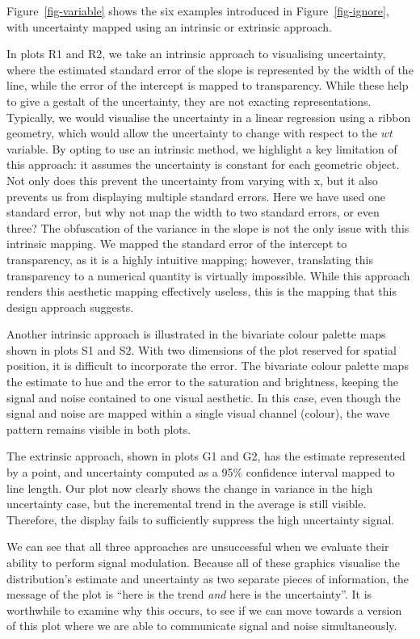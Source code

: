 \documentclass[]{ar-1col-S2O}
\begin{document}
Figure~\ref{fig-variable} shows the six examples introduced in
Figure~\ref{fig-ignore}, with uncertainty mapped using an intrinsic or
extrinsic approach.

In plots R1 and R2, we take an intrinsic approach to visualising
uncertainty, where the estimated standard error of the slope is
represented by the width of the line, while the error of the intercept
is mapped to transparency. While these help to give a gestalt of the
uncertainty, they are not exacting representations. Typically, we would
visualise the uncertainty in a linear regression using a ribbon
geometry, which would allow the uncertainty to change with respect to
the \(wt\) variable. By opting to use an intrinsic method, we highlight
a key limitation of this approach: it assumes the uncertainty is
constant for each geometric object. Not only does this prevent the
uncertainty from varying with x, but it also prevents us from displaying
multiple standard errors. Here we have used one standard error, but why
not map the width to two standard errors, or even three? The obfuscation
of the variance in the slope is not the only issue with this intrinsic
mapping. We mapped the standard error of the intercept to transparency,
as it is a highly intuitive mapping; however, translating this
transparency to a numerical quantity is virtually impossible. While this
approach renders this aesthetic mapping effectively useless, this is the
mapping that this design approach suggests.

Another intrinsic approach is illustrated in the bivariate colour
palette maps shown in plots S1 and S2. With two dimensions of the plot
reserved for spatial position, it is difficult to incorporate the error.
The bivariate colour palette maps the estimate to hue and the error to
the saturation and brightness, keeping the signal and noise contained to
one visual aesthetic. In this case, even though the signal and noise are
mapped within a single visual channel (colour), the wave pattern remains
visible in both plots.

The extrinsic approach, shown in plots G1 and G2, has the estimate
represented by a point, and uncertainty computed as a 95\% confidence
interval mapped to line length. Our plot now clearly shows the change in
variance in the high uncertainty case, but the incremental trend in the
average is still visible. Therefore, the display fails to sufficiently
suppress the high uncertainty signal.

We can see that all three approaches are unsuccessful when we evaluate
their ability to perform signal modulation. Because all of these
graphics visualise the distribution's estimate and uncertainty as two
separate pieces of information, the message of the plot is ``here is the
trend \emph{and} here is the uncertainty''. It is worthwhile to examine
why this occurs, to see if we can move towards a version of this plot
where we are able to communicate signal and noise simultaneously.
\end{document}
